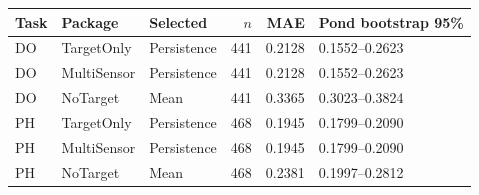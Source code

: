 \begin{tabular}{lllrrl}
\toprule
Task & Package & Selected & $n$ & MAE & Pond bootstrap 95\% \\
\midrule
DO & TargetOnly & Persistence & 441 & 0.2128 & 0.1552--0.2623 \\
DO & MultiSensor & Persistence & 441 & 0.2128 & 0.1552--0.2623 \\
DO & NoTarget & Mean & 441 & 0.3365 & 0.3023--0.3824 \\
PH & TargetOnly & Persistence & 468 & 0.1945 & 0.1799--0.2090 \\
PH & MultiSensor & Persistence & 468 & 0.1945 & 0.1799--0.2090 \\
PH & NoTarget & Mean & 468 & 0.2381 & 0.1997--0.2812 \\
\bottomrule
\end{tabular}